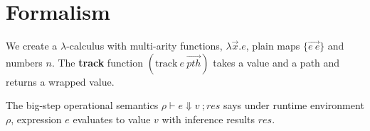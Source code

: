 \section{Formalism}

We create a $\lambda$-calculus with multi-arity functions,
$\lambda \overrightarrow{x}. e$,
plain maps
$\{\overrightarrow{e\ e}\}$
and
numbers $n$.
The \textbf{track} function
$(\text{track}\ e\ \overrightarrow{pth})$
takes a value and a path and returns 
a wrapped value.

The big-step operational semantics
$\rho \vdash e \Downarrow v\ ; res$
says under runtime environment $\rho$,
expression $e$ evaluates to value $v$
with inference results $res$.
